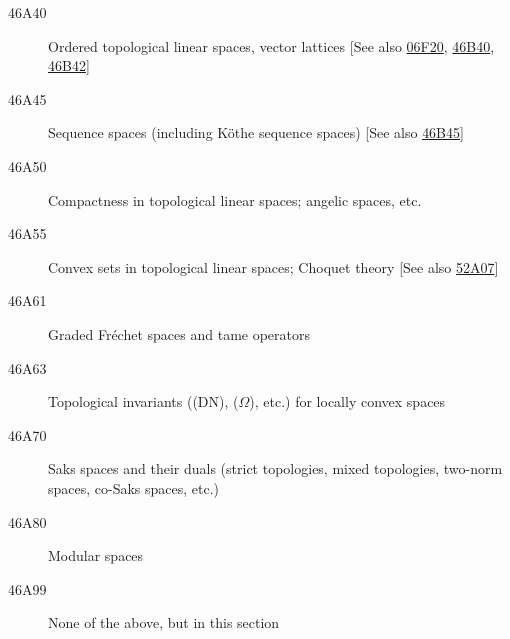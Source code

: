 \begin{description}
\item [46A40]\label{46A40} Ordered topological linear spaces, vector lattices [See also \hyperref[06F20]{06F20}, \hyperref[46B40]{46B40}, \hyperref[46B42]{46B42}]
\item [46A45]\label{46A45} Sequence spaces (including K\"{o}the sequence spaces) [See also \hyperref[46B45]{46B45}]
\item [46A50]\label{46A50} Compactness in topological linear spaces; angelic spaces, etc.
\item [46A55]\label{46A55} Convex sets in topological linear spaces; Choquet theory [See also \hyperref[52A07]{52A07}]
\item [46A61]\label{46A61} Graded Fr\'{e}chet spaces and tame operators
\item [46A63]\label{46A63} Topological invariants ((DN), ($\Omega$), etc.) for locally convex spaces
\item [46A70]\label{46A70} Saks spaces and their duals (strict topologies, mixed topologies, two-norm spaces, co-Saks spaces, etc.)
\item [46A80]\label{46A80} Modular spaces
\item [46A99]\label{46A99} None of the above, but in this section
\end{description}
